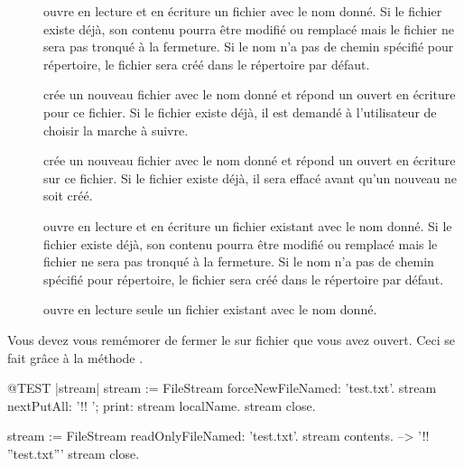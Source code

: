 \documentclass[a4paper,10pt,twoside]{book}
\begin{document}
\begin{description}

\item[] ouvre en lecture et en \'ecriture un fichier 
  avec le nom donn\'e. Si le fichier existe d\'ej\`a, son contenu pourra
  \^etre modifi\'e ou remplac\'e mais le fichier ne sera pas tronqu\'e
  \`a la fermeture. Si le nom n'a pas de chemin sp\'ecifi\'e pour r\'epertoire,
  le fichier sera cr\'e\'e dans le r\'epertoire par d\'efaut.
  
\item[] cr\'ee un nouveau fichier avec le nom donn\'e
	et r\'epond un \stream ouvert en \'ecriture pour ce fichier.
	Si le fichier existe d\'ej\`a, il est demand\'e \`a l'utilisateur
	de choisir la marche \`a suivre.
  
\item[] cr\'ee un nouveau fichier avec le nom donn\'e
	et r\'epond un \stream ouvert en \'ecriture sur ce fichier.
	Si le fichier existe d\'ej\`a, il sera effac\'e avant qu'un nouveau
	ne soit cr\'e\'e.

\item[] ouvre en lecture et en \'ecriture un fichier 
	existant avec le nom donn\'e. Si le fichier existe d\'ej\`a, son 
	contenu pourra \^etre modifi\'e ou remplac\'e mais le fichier ne sera
	pas tronqu\'e \`a la fermeture. Si le nom n'a pas de chemin sp\'ecifi\'e
	pour r\'epertoire, le fichier sera cr\'e\'e dans le r\'epertoire par
	d\'efaut.

\item[] ouvre en lecture seule un fichier 
	existant avec le nom donn\'e.

\end{description}

Vous devez vous rem\'emorer de fermer le \stream sur fichier que vous avez ouvert. Ceci se fait gr\^ace \`a la m\'ethode .

\begin{code}{@TEST |stream|}
stream := FileStream forceNewFileNamed: 'test.txt'.
stream
    nextPutAll: '!! ';
    print: stream localName.
stream close.

stream := FileStream readOnlyFileNamed: 'test.txt'.
stream contents. --> '!! ''test.txt'''
stream close.
\end{code}
\end{document}
